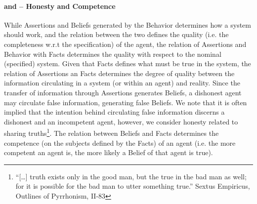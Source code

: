 \paragraph{\Rcc{$\assertionRegion$}{$\factRegion$} and \Rcc{$\behaviorRegion$}{$\factRegion$} -- Honesty and Competence}
While Assertions and Beliefs generated by the Behavior determines how a system should work, and the
relation between the two defines the quality (i.e. the completeness w.r.t the specification) of the agent, the relation of
Assertions and Behavior with Facts determines the quality with respect to the
nominal (specified) system.  Given that Facts defines what must be true in the
system, the relation of Assertions an Facts
determines the degree of quality between the information circulating in a
system (or within an agent) and reality.
Since the transfer of information through Assertions
generates Beliefs, a dishonest agent may circulate false information,
generating false Beliefs.  We note that it is often implied that the intention behind
circulating false information discerns a dishonest and an incompetent agent,
however, we consider honesty related to sharing truths\footnote{``[\ldots] truth
exists only in the good man, but the true in the bad man as well; for it is
possible for the bad man to utter something true.''
Sextus Empiricus, Outlines of Pyrrhonism, II-83\autocite{Empiricus1990Pyrrhonism}}.  The
relation between Beliefs and Facts determines the competence (on the subjects
defined by the Facts) of an agent (i.e. the more competent an agent is, the
more likely a Belief of that agent is true).

